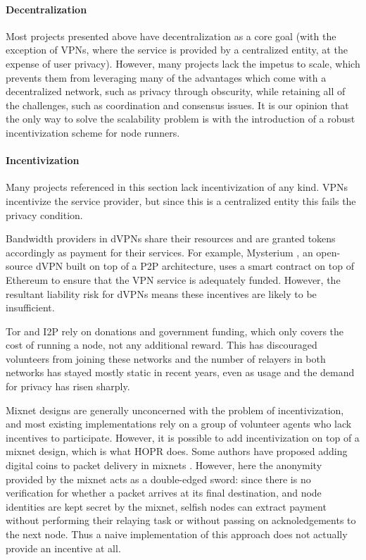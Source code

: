 \paragraph{Decentralization} Most projects presented above have decentralization as a core goal (with the exception of VPNs, where the service is provided by a centralized entity, at the expense of user privacy). However, many projects lack the impetus to scale, which prevents them from leveraging many of the advantages which come with a decentralized network, such as privacy through obscurity, while retaining all of the challenges, such as coordination and consensus issues. It is our opinion that the only way to solve the scalability problem is with the introduction of a robust incentivization scheme for node runners.

\paragraph{Incentivization} Many projects referenced in this section lack incentivization of any kind. VPNs incentivize the service provider, but since this is a centralized entity this fails the privacy condition.

Bandwidth providers in dVPNs share their resources and are granted tokens accordingly as payment for their services. For example, Mysterium \cite{mysterium}, an open-source dVPN built on top of a P2P architecture, uses a smart contract on top of Ethereum to ensure that the VPN service is adequately funded. However, the resultant liability risk for dVPNs means these incentives are likely to be insufficient.

Tor and I2P rely on donations and government funding, which only covers the cost of running a node, not any additional reward. This has discouraged volunteers from joining these networks and the number of relayers in both networks has stayed mostly static in recent years, even as usage and the demand for privacy has risen sharply.

Mixnet designs are generally unconcerned with the problem of incentivization, and most existing implementations rely on a group of volunteer agents who lack incentives to participate. However, it is possible to add incentivization on top of a mixnet design, which is what HOPR does. Some authors have proposed adding digital coins to packet delivery in mixnets \cite{MixnetCoins}. However, here the anonymity provided by the mixnet acts as a double-edged sword: since there is no verification for whether a packet arrives at its final destination, and node identities are kept secret by the mixnet, selfish nodes can extract payment without performing their relaying task or without passing on acknoledgements to the next node. Thus a naive implementation of this approach does not actually provide an incentive at all.

